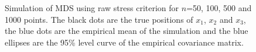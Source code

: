 \begin{figure}[tp]
    \centering
    \quad
    \quad
    \quad
    \caption{Simulation of MDS using raw stress criterion for $n$=50, 100, 500 and 1000 points.
                  The black dots are the true positions of $x_1$, $x_2$ and $x_3$, the blue dots are the empirical mean of the simulation and the blue ellipses are the 95\% level curve of the empirical covariance matrix.}
    \label{fig:RawStress}
\end{figure}

